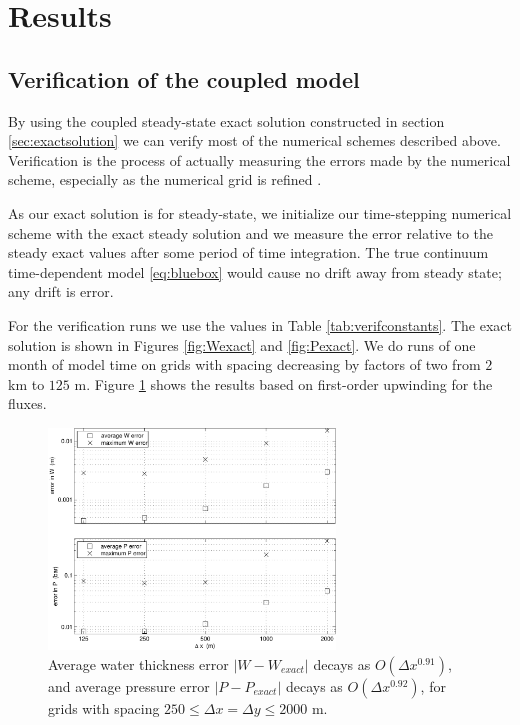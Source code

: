 \documentclass[gmd]{copernicus}   %
\begin{document}
\section{Results}  \label{sec:results}

\subsection{Verification of the coupled model}  By using the coupled steady-state exact solution constructed in section \ref{sec:exactsolution} we can verify most of the numerical schemes described above.  Verification is the process of actually measuring the errors made by the numerical scheme, especially as the numerical grid is refined \citep[for example]{Wesseling}.

As our exact solution is for steady-state, we initialize our time-stepping numerical scheme with the exact steady solution and we measure the error relative to the steady exact values after some period of time integration.  The true continuum time-dependent model \eqref{eq:bluebox} would cause no drift away from steady state; any drift is error.

For the verification runs we use the values in Table \ref{tab:verifconstants}.  The exact solution is shown in Figures \ref{fig:Wexact} and \ref{fig:Pexact}.  We do runs of one month of model time on grids with spacing decreasing by factors of two from $2$ km to $125$ m.  Figure \ref{fig:refineWPpism} shows the results based on first-order upwinding for the fluxes.

\begin{figure}[ht]
\includegraphics[width=3.0in,keepaspectratio=true]{refineWPpism}
\caption{Average water thickness error $|W-W_{exact}|$ decays as $O(\Delta x^{0.91})$, and average pressure error $|P-P_{exact}|$ decays as $O(\Delta x^{0.92})$, for grids with spacing $250 \le \Delta x = \Delta y \le 2000$ m.}
\label{fig:refineWPpism}
\end{figure}
\end{document}
